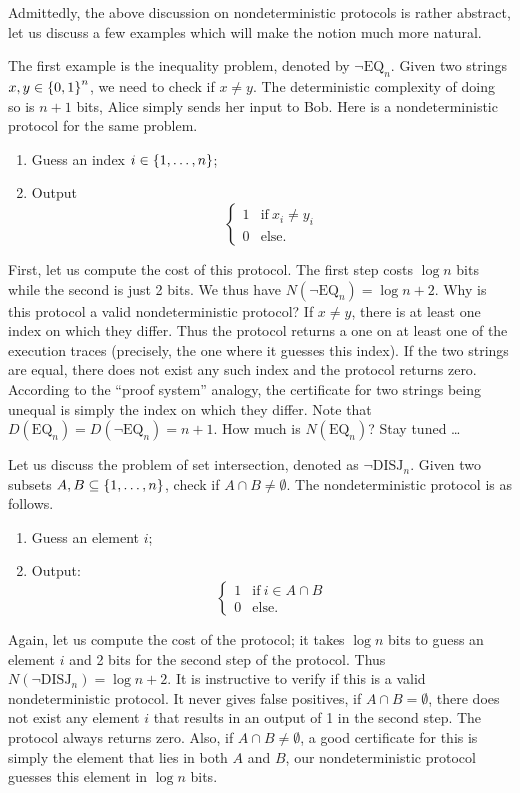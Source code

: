 \documentclass[letterpaper]{article}
\providecommand\cbrac[1]{\ensuremath \left\{#1\right\}}
\newcommand{\nDISJ}{\neg \mathrm{DISJ}}
\newcommand{\EQ}{\mathrm{EQ}}
\newcommand{\nEQ}{\neg \mathrm{EQ}}
\begin{document}
Admittedly, the above discussion on nondeterministic protocols is rather abstract, let us discuss a few examples which will make the notion much more natural.

\begin{example}
The first example is the inequality problem, denoted by $\nEQ_n$. Given two strings $x, y \in \cbrac{0,1}^n$, we need to check if $x \neq y$. The deterministic complexity of doing so is $n+1$ bits, Alice simply sends her input to Bob. Here is a nondeterministic protocol for the same problem.
\begin{enumerate}
    \item Guess an index $i \in \cbrac{1, \ldots, n}$;
    \item Output
         $$
            \begin{cases}
            1 & \mathrm{if}\ x_i \neq y_i\\
            0 & \mathrm{else.}
            \end{cases}
         $$
\end{enumerate}
First, let us compute the cost of this protocol. The first step costs $\log n$ bits while the second is just 2 bits. We thus have $N(\nEQ_n) = \log n + 2$. Why is this protocol a valid nondeterministic protocol? If $x \neq y$, there is at least one index on which they differ. Thus the protocol returns a one on at least one of the execution traces (precisely, the one where it guesses this index). If the two strings are equal, there does not exist any such index and the protocol returns zero. According to the ``proof system'' analogy, the certificate for two strings being unequal is simply the index on which they differ. Note that $D(\EQ_n) = D(\nEQ_n) = n+1$. How much is $N(\EQ_n)$? Stay tuned \ldots
\end{example}

\begin{example}
Let us discuss the problem of set intersection, denoted as $\nDISJ_n$. Given two subsets $A, B \subseteq \cbrac{1, \ldots, n}$, check if $A \cap B \neq \emptyset$. The nondeterministic protocol is as follows.
\begin{enumerate}
    \item Guess an element $i$;
    \item Output:
         $$
            \begin{cases}
            1 & \mathrm{if}\ i \in A \cap B\\
            0 & \mathrm{else.}
            \end{cases}
         $$
\end{enumerate}
Again, let us compute the cost of the protocol; it takes $\log n$ bits to guess an element $i$ and 2 bits for the second step of the protocol. Thus $N(\nDISJ_n) = \log n + 2$. It is instructive to verify if this is a valid nondeterministic protocol. It never gives false positives, if $A \cap B = \emptyset$, there does not exist any element $i$ that results in an output of 1 in the second step. The protocol always returns zero. Also, if $A \cap B \neq \emptyset$, a good certificate for this is simply the element that lies in both $A$ and $B$, our nondeterministic protocol guesses this element in $\log n$ bits.
\end{example}
\end{document}
